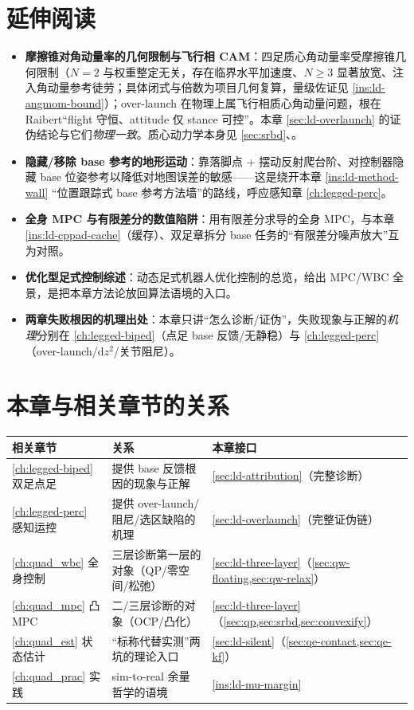 \section*{延伸阅读}
\begin{itemize}
  \item \textbf{摩擦锥对角动量率的几何限制与飞行相 CAM}：四足质心角动量率受摩擦锥几何限制（$N{=}2$ 与权重整定无关，存在临界水平加速度、$N\ge 3$ 显著放宽、注入角动量参考徒劳；具体闭式与倍数为项目几何复算，量级佐证见 \cref{ins:ld-angmom-bound}）；over-launch 在物理上属飞行相质心角动量问题，根在 Raibert“flight 守恒、attitude 仅 stance 可控”\cite{raibert1986legged}。本章 \cref{sec:ld-overlaunch} 的证伪结论与它们\emph{物理一致}。质心动力学本身见 \cref{sec:srbd}、\cite{orin2013centroidal}。
  \item \textbf{隐藏/移除 base 参考的地形运动}：靠落脚点 + 摆动反射爬台阶、对控制器隐藏 base 位姿参考以降低对地图误差的敏感\cite{corberes2023stairs,jenelten2023dtc}——这是绕开本章 \cref{ins:ld-method-wall} “位置跟踪式 base 参考方法墙”的路线，呼应感知章 \cref{ch:legged-perc}。
  \item \textbf{全身 MPC 与有限差分的数值陷阱}：用有限差分求导的全身 MPC\cite{howell2023wholebodympc}，与本章 \cref{ins:ld-cppad-cache}（缓存）、双足章拆分 base 任务的“有限差分噪声放大”互为对照。
  \item \textbf{优化型足式控制综述}：动态足式机器人优化控制的总览\cite{wensing2024legged}，给出 MPC/WBC 全景，是把本章方法论放回算法语境的入口。
  \item \textbf{两章失败根因的机理出处}：本章只讲“怎么诊断/证伪”，失败现象与正解的\emph{机理}分别在 \cref{ch:legged-biped}（点足 base 反馈/无静稳）与 \cref{ch:legged-perc}（over-launch/$\mathrm{d}z^2$/关节阻尼）。
\end{itemize}

\section*{本章与相关章节的关系}
\begin{table}[H]\centering\small
\begin{tabular}{lll}
\toprule
相关章节 & 关系 & 本章接口 \\
\midrule
\cref{ch:legged-biped} 双足点足 & 提供 base 反馈根因的现象与正解 & \cref{sec:ld-attribution}（完整诊断）\\
\cref{ch:legged-perc} 感知运控 & 提供 over-launch/阻尼/选区缺陷的机理 & \cref{sec:ld-overlaunch}（完整证伪链）\\
\cref{ch:quad_wbc} 全身控制 & 三层诊断第一层的对象（QP/零空间/松弛）& \cref{sec:ld-three-layer}（\cref{sec:qw-floating,sec:qw-relax}）\\
\cref{ch:quad_mpc} 凸 MPC & 二/三层诊断的对象（OCP/凸化）& \cref{sec:ld-three-layer}（\cref{sec:qp,sec:srbd,sec:convexify}）\\
\cref{ch:quad_est} 状态估计 & “标称代替实测”两坑的理论入口 & \cref{sec:ld-silent}（\cref{sec:qe-contact,sec:qe-kf}）\\
\cref{ch:quad_prac} 实践 & sim-to-real 余量哲学的语境 & \cref{ins:ld-mu-margin}\\
\bottomrule
\end{tabular}
\end{table}

